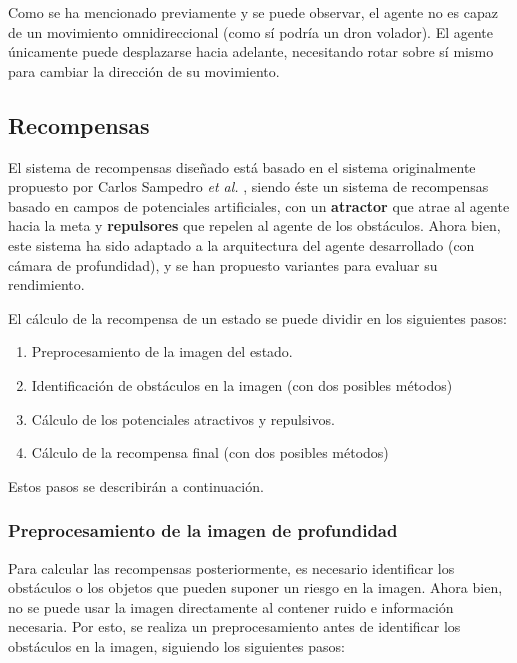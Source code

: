 Como se ha mencionado previamente y se puede observar, el agente no es capaz de un movimiento omnidireccional (como sí podría un dron volador). El agente únicamente puede desplazarse hacia adelante, necesitando rotar sobre sí mismo para cambiar la dirección de su movimiento.

\subsection{Recompensas}

El sistema de recompensas diseñado está basado en el sistema originalmente propuesto por Carlos Sampedro \textit{et al.} \cite{Sampedro2018}, siendo éste un sistema de recompensas basado en campos de potenciales artificiales, con un \textbf{atractor} que atrae al agente hacia la meta y \textbf{repulsores} que repelen al agente de los obstáculos. Ahora bien, este sistema ha sido adaptado a la arquitectura del agente desarrollado (con cámara de profundidad), y se han propuesto variantes para evaluar su rendimiento.

El cálculo de la recompensa de un estado se puede dividir en los siguientes pasos:
\begin{enumerate}
	\item Preprocesamiento de la imagen del estado.
	\item Identificación de obstáculos en la imagen (con dos posibles métodos)
	\item Cálculo de los potenciales atractivos y repulsivos.
	\item Cálculo de la recompensa final (con dos posibles métodos)
\end{enumerate}

Estos pasos se describirán a continuación.

\subsubsection{Preprocesamiento de la imagen de profundidad}

Para calcular las recompensas posteriormente, es necesario identificar los obstáculos o los objetos que pueden suponer un riesgo en la imagen. Ahora bien, no se puede usar la imagen directamente al contener ruido e información necesaria. Por esto, se realiza un preprocesamiento antes de identificar los obstáculos en la imagen, siguiendo los siguientes pasos:

